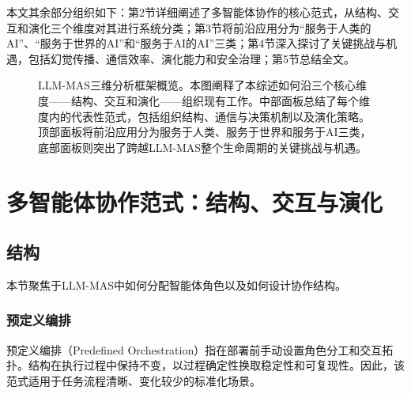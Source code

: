 \documentclass[UTF8,a4paper,12pt]{article}
\begin{document}
本文其余部分组织如下：第2节详细阐述了多智能体协作的核心范式，从结构、交互和演化三个维度对其进行系统分类；第3节将前沿应用分为``服务于人类的AI''、``服务于世界的AI''和``服务于AI的AI''三类；第4节深入探讨了关键挑战与机遇，包括幻觉传播、通信效率、演化能力和安全治理；第5节总结全文。

\begin{figure}[htbp]
\centering
{}
\caption{LLM-MAS三维分析框架概览。本图阐释了本综述如何沿三个核心维度——结构、交互和演化——组织现有工作。中部面板总结了每个维度内的代表性范式，包括组织结构、通信与决策机制以及演化策略。顶部面板将前沿应用分为服务于人类、服务于世界和服务于AI三类，底部面板则突出了跨越LLM-MAS整个生命周期的关键挑战与机遇。}
\label{fig:overview}
\end{figure}

\newpage
\section{多智能体协作范式：结构、交互与演化}

\subsection{结构}

本节聚焦于LLM-MAS中如何分配智能体角色以及如何设计协作结构。

\subsubsection{预定义编排}

预定义编排（Predefined Orchestration）指在部署前手动设置角色分工和交互拓扑。结构在执行过程中保持不变，以过程确定性换取稳定性和可复现性。因此，该范式适用于任务流程清晰、变化较少的标准化场景。
\end{document}
